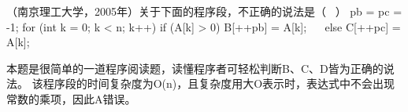 \question （南京理工大学，2005年）关于下面的程序段，不正确的说法是（ ~） pb = pc =
-1; for (int k = 0; k \textless{} n; k++) if (A{[}k{]} \textgreater{} 0)
B{[}++pb{]} = A{[}k{]}; ~ ~else C{[}++pc{]} = A{[}k{]};
\par{}
\begin{solution}本题是很简单的一道程序阅读题，读懂程序者可轻松判断B、C、D皆为正确的说法。
该程序段的时间复杂度为O(n)，且复杂度用大O表示时，表达式中不会出现常数的乘项，因此A错误。
\end{solution}
